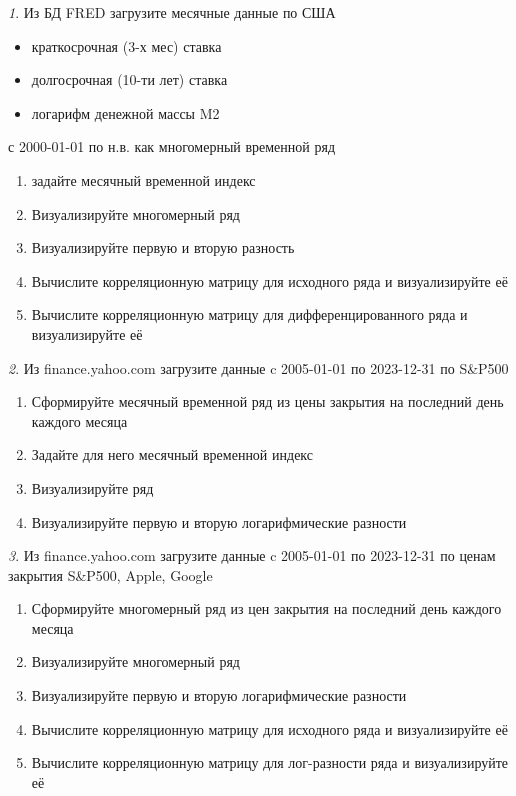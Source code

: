 \documentclass[12pt]{article}
\theoremstyle{remark}
\newtheorem{exercise}{}[subsection]
\begin{document}
\begin{exercise}
Из БД FRED загрузите месячные данные по США
\begin{itemize}
	\item краткосрочная (3-х мес) ставка
	\item долгосрочная (10-ти лет) ставка
	\item логарифм денежной массы M2
\end{itemize}
с 2000-01-01 по н.в. как многомерный временной ряд
\begin{enumerate}
	\item задайте месячный временной индекс
	\item Визуализируйте многомерный ряд
	\item Визуализируйте первую и вторую разность
	\item Вычислите корреляционную матрицу для исходного ряда и визуализируйте её
	\item Вычислите корреляционную матрицу для дифференцированного ряда и визуализируйте её
\end{enumerate}
\end{exercise}

\begin{exercise}
Из finance.yahoo.com загрузите данные c 2005-01-01 по 2023-12-31 по S\&P500
\begin{enumerate}
	\item Сформируйте месячный временной ряд из цены закрытия на последний день каждого месяца
	\item Задайте для него месячный временной индекс
	\item Визуализируйте ряд
	\item Визуализируйте первую и вторую логарифмические разности
\end{enumerate}
\end{exercise}

\begin{exercise}
Из finance.yahoo.com загрузите данные c 2005-01-01 по 2023-12-31 по
ценам закрытия S\&P500, Apple, Google
\begin{enumerate}
	\item Сформируйте многомерный ряд из цен закрытия на последний день каждого месяца
	\item Визуализируйте многомерный ряд
	\item Визуализируйте первую и вторую логарифмические разности
	\item Вычислите корреляционную матрицу для исходного ряда и визуализируйте её
	\item Вычислите корреляционную матрицу для лог-разности ряда и визуализируйте её
\end{enumerate}
\end{exercise}
\end{document}

